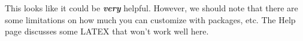 This looks like it could be \textbf{\textit{very}} helpful. However, we should note that there are some limitations on how much you can customize with packages, etc. The Help page discusses some LATEX that won't work well here. 
  
  
  